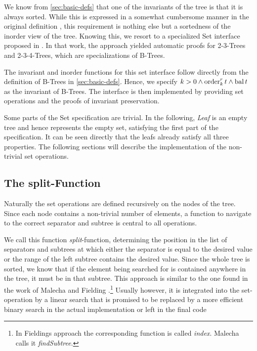 We know from \autoref{sec:basic-defs} that one of the invariants
of the tree is that it is always sorted.
While this is expressed in a somewhat cumbersome manner
in the original definition \parencite{DBLP:journals/acta/BayerM72},
this requirement is nothing else but a sortedness of the inorder view of the tree.
Knowing this, we resort to a specialized Set interface
proposed in \parencite{DBLP:conf/itp/Nipkow16}.
In that work, the approach yielded automatic proofs for 2-3-Trees
and 2-3-4-Trees, which are specializations of B-Trees.

The invariant and inorder functions for this set interface
follow directly from the definition of B-Trees in \autoref{sec:basic-defs}.
Hence, we specify $k > 0 \wedge \operatorname{order}^r_k t \wedge \operatorname{bal} t$
as the invariant of B-Trees.
The interface is then implemented by providing set operations
and the proofs of invariant preservation.

Some parts of the Set specification are trivial.
In the following, \textit{Leaf} is an empty tree and hence represents
the empty set, satisfying the first part of the specification.
It can be seen directly that the leafs already satisfy all three properties.
The following sections will describe the implementation of the
non-trivial set operations.

\subsection{The split-Function}

Naturally the set operations are defined recursively on the nodes of the tree.
Since each node contains a non-trivial number of elements,
a function to navigate to the correct separator and subtree is central to all operations.

We call this function \textit{split}-function,
determining the position in the list of separators and subtrees at which
either the separator is equal to the desired value or the range of the left subtree
contains the desired value.
Since the whole tree is sorted, we know that if the element being searched for
is contained anywhere in the tree, it must be in that subtree.
This approach is similar to the one found in the work of Malecha and Fielding \parencite{DBLP:conf/popl/MalechaMSW10,Fielding80}.\footnote{
    In Fieldings approach the corresponding function is called \textit{index}.
    Malecha calls it \textit{findSubtree}.
}
Usually however, it is integrated into the set-operation
by a linear search that is promised to be replaced by a more efficient binary search
in the actual implementation \parencite{DBLP:books/daglib/0023376,DBLP:journals/acta/BayerM72}
or left in the final code \parencite{DBLP:journals/sosym/ErnstSR15}

